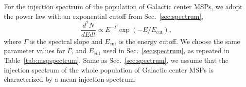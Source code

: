 \documentclass[doublespace,nopageskip]{VTthesis}
\begin{document}
For the injection spectrum of the population of Galactic center MSPs, we adopt the power law with an exponential cutoff from Sec.~\ref{sec:spectrum},
\begin{equation}
  \label{eq:mspspectrum}
  \dfrac{d^2N}{dEdt} \propto E^{-\Gamma}\exp(-E/E_{\text{cut}}),
\end{equation}
where $\Gamma$ is the spectral slope and $E_{\text{cut}}$ is the energy cutoff. We choose the same parameter values for $\Gamma$, and $E_{\text{cut}}$ used in Sec.~\ref{sec:spectrum}, as repeated in Table~\ref{tab:mspspectrum}. Same as Sec.~\ref{sec:spectrum}, we assume that the injection spectrum of the whole population of Galactic center MSPs is characterized by a mean injection spectrum.

\end{document}
